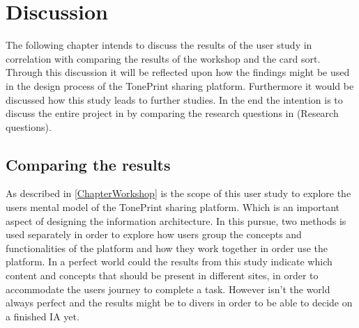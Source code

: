 \chapter{Discussion}
\label{Discussion}
The following chapter intends to discuss the results of the user study in correlation with comparing the results of the workshop and the card sort. Through this discussion it will be reflected upon how the findings might be used in the design process of the TonePrint sharing platform. Furthermore it would be discussed how this study leads to further studies. In the end the intention is to discuss the entire project in by comparing the research questions in (Research questions).


\section{Comparing the results}
\label{ComparingResults}
%
As described in \autoref{ChapterWorkshop} is the scope of this user study to explore the users mental model of the TonePrint sharing platform. Which is an important aspect of designing the information architecture. In this pursue, two methods is used separately in order to explore how users group the concepts and functionalities of the platform and how they work together in order use the platform. In a perfect world could the results from this study indicate which content and concepts that should be present in different sites, in order to accommodate the users journey to complete a task. However isn't the world always perfect and the results might be to divers in order to be able to decide on a finished IA yet.\\
\\
